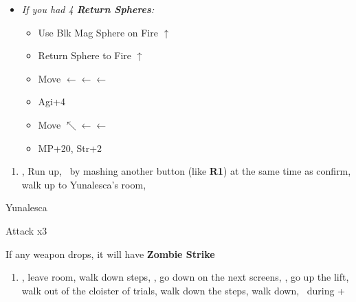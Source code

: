 \begin{spheregrid}
    \begin{itemize}
        \yunaf
        \begin{itemize}
            \item \textit{If you had 4 \textbf{Return Spheres}:}
            \begin{itemize}
                \item Use Blk Mag Sphere on Fire $\uparrow$
                \item Return Sphere to Fire $\uparrow$
                \item Move $\leftarrow\leftarrow\leftarrow$
                \item Agi+4
                \item Move $\nwarrow\leftarrow\leftarrow$
                \item MP+20, Str+2
            \end{itemize}
        \end{itemize}
    \end{itemize}
\end{spheregrid}
\losscb
\begin{enumerate}[resume]
    \item \save, Run up, \sd\ by mashing another button (like \textbf{R1}) at the same time as confirm, walk up to Yunalesca's room, \sd
\end{enumerate}
\begin{battle}[132000]{Yunalesca}
    \begin{itemize}
        \summon{\bahamut}
        \bahamutf Attack x3
    \end{itemize}
    If any weapon drops, it will have \textbf{Zombie Strike}
\end{battle}
\begin{enumerate}[resume]
    \item \sd, leave room, walk down steps, \sd, go down on the next screens, \save, go up the lift, walk out of the cloister of trials, walk down the steps, walk down, \sd\ during \cs+\skippablefmv
\end{enumerate}
